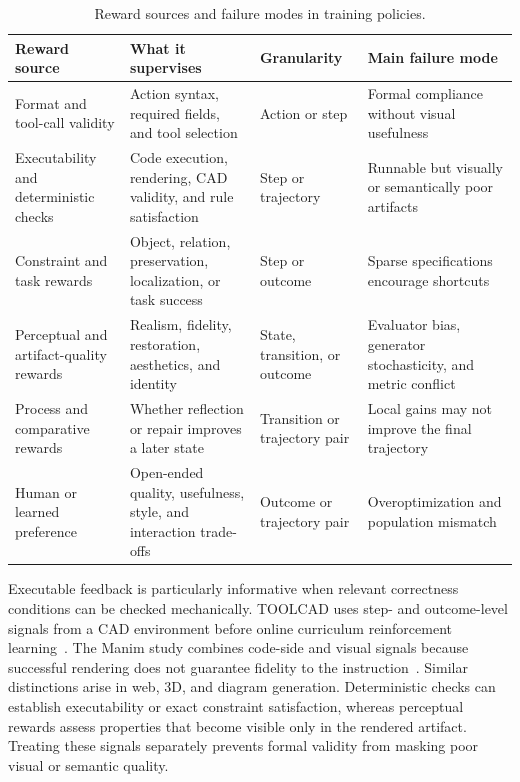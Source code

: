 \begin{table}[t]
  \caption{Reward sources and failure modes in training \AVG{} policies.}
  \label{tab:reward-sources}
  \small
  \begin{tabularx}{\textwidth}{@{}p{}XXX@{}}
    \toprule
    Reward source & What it supervises & Granularity & Main failure mode \\
    \midrule
    Format and tool-call validity & Action syntax, required fields, and tool selection & Action or step & Formal compliance without visual usefulness \\
    Executability and deterministic checks & Code execution, rendering, CAD validity, and rule satisfaction & Step or trajectory & Runnable but visually or semantically poor artifacts \\
    Constraint and task rewards & Object, relation, preservation, localization, or task success & Step or outcome & Sparse specifications encourage shortcuts \\
    Perceptual and artifact-quality rewards & Realism, fidelity, restoration, aesthetics, and identity & State, transition, or outcome & Evaluator bias, generator stochasticity, and metric conflict \\
    Process and comparative rewards & Whether reflection or repair improves a later state & Transition or trajectory pair & Local gains may not improve the final trajectory \\
    Human or learned preference & Open-ended quality, usefulness, style, and interaction trade-offs & Outcome or trajectory pair & Overoptimization and population mismatch \\
    \bottomrule
  \end{tabularx}
\end{table}
\FloatBarrier

Executable feedback is particularly informative when relevant correctness conditions can be checked mechanically. TOOLCAD uses step- and outcome-level signals from a CAD environment before online curriculum reinforcement learning~\cite{gong2026toolcad}. The Manim study combines code-side and visual signals because successful rendering does not guarantee fidelity to the instruction~\cite{avg260418364}. Similar distinctions arise in web, 3D, and diagram generation. Deterministic checks can establish executability or exact constraint satisfaction, whereas perceptual rewards assess properties that become visible only in the rendered artifact. Treating these signals separately prevents formal validity from masking poor visual or semantic quality.

